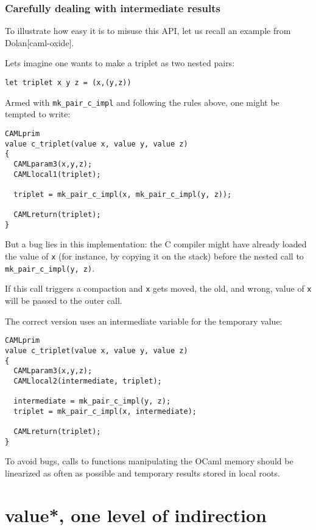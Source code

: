 \documentclass[a4paper]{easychair}
\begin{document}
\subsubsection{Carefully dealing with intermediate results}

To illustrate how easy it is to misuse this API, let us recall an
example from Dolan{[}caml-oxide{]}.

Lets imagine one wants to make a triplet as two nested pairs:

\begin{lstlisting}[]
let triplet x y z = (x,(y,z))
\end{lstlisting}

Armed with \texttt{mk\_pair\_c\_impl} and following the rules above, one
might be tempted to write:

\begin{lstlisting}[]
CAMLprim
value c_triplet(value x, value y, value z)
{
  CAMLparam3(x,y,z);
  CAMLlocal1(triplet);

  triplet = mk_pair_c_impl(x, mk_pair_c_impl(y, z));

  CAMLreturn(triplet);
}
\end{lstlisting}

But a bug lies in this implementation: the C compiler might have already
loaded the value of \texttt{x} (for instance, by copying it on the
stack) before the nested call to \texttt{mk\_pair\_c\_impl(y,\ z)}.

If this call triggers a compaction and \texttt{x} gets moved, the old,
and wrong, value of \texttt{x} will be passed to the outer call.

The correct version uses an intermediate variable for the temporary
value:

\begin{lstlisting}[]
CAMLprim
value c_triplet(value x, value y, value z)
{
  CAMLparam3(x,y,z);
  CAMLlocal2(intermediate, triplet);

  intermediate = mk_pair_c_impl(y, z);
  triplet = mk_pair_c_impl(x, intermediate);

  CAMLreturn(triplet);
}
\end{lstlisting}

To avoid bugs, calls to functions manipulating the OCaml memory should
be linearized as often as possible and temporary results stored in local
roots.

\section{value*, one level of indirection}
\end{document}
